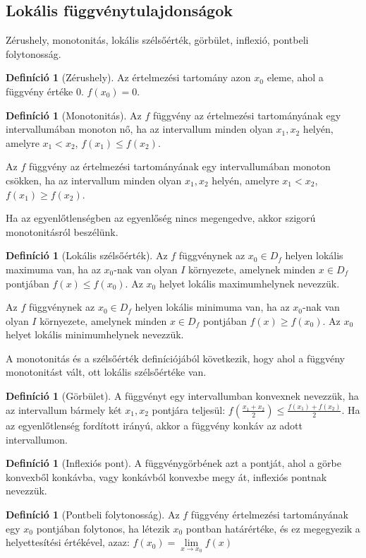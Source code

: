 \documentclass[twoside,12pt]{report}
\theoremstyle{definition}
\newtheorem{definition}[theorem]{Definíció}
\begin{document}
	\subsection{Lokális függvénytulajdonságok}
	Zérushely, monotonitás, lokális szélsőérték, görbület, inflexió, pontbeli folytonosság.
	\begin{definition}[Zérushely]
		Az értelmezési tartomány azon $x_0$ eleme, ahol a függvény értéke 0. $f(x_0)=0$.
	\end{definition}
	\begin{definition}[Monotonitás]
		Az $f$ függvény az értelmezési tartományának egy intervallumában monoton nő, ha az intervallum minden olyan $x_1, x_2$ helyén, amelyre $x_1<x_2$, $f(x_1)\le f(x_2)$.
		
		Az $f$ függvény az értelmezési tartományának egy intervallumában monoton csökken, ha az intervallum minden olyan $x_1, x_2$ helyén, amelyre $x_1<x_2$, $f(x_1)\ge f(x_2)$.
		
		Ha az egyenlőtlenségben az egyenlőség nincs megengedve, akkor szigorú monotonitásról
		beszélünk.
	\end{definition}
	\begin{definition}[Lokális szélsőérték]
		Az $f$ függvénynek az $x_0\in D_f$ helyen lokális maximuma van, ha az $x_0$-nak van olyan $I$ környezete, amelynek minden $x\in D_f$ pontjában $f(x)\le f(x_0)$. Az $x_0$ helyet lokális maximumhelynek nevezzük.
		
		Az $f$ függvénynek az $x_0\in D_f$ helyen lokális minimuma van, ha az $x_0$-nak van olyan $I$ környezete, amelynek minden $x\in D_f$ pontjában $f(x)\ge f(x_0)$. Az $x_0$ helyet lokális minimumhelynek nevezzük.
	\end{definition}
	A monotonitás és a szélsőérték definíciójából következik, hogy ahol a függvény monotonitást
	vált, ott lokális szélsőértéke van.
	\begin{definition}[Görbület]
		A függvényt egy intervallumban konvexnek nevezzük, ha az intervallum bármely két $x_1,x_2$ pontjára teljesül: $f\left(\frac{x_1+x_2}{2}\right)\le\frac{f(x_1)+f(x_2)}{2}$. Ha az egyenlőtlenség fordított irányú, akkor a függvény konkáv az adott intervallumon.
	\end{definition}
	\begin{definition}[Inflexiós pont]
		A függvénygörbének azt a pontját, ahol a görbe konvexből konkávba, vagy
		konkávból konvexbe megy át, inflexiós pontnak nevezzük.
	\end{definition}
	\begin{definition}[Pontbeli folytonosság]
		Az $f$ függvény értelmezési tartományának egy $x_0$ pontjában folytonos, ha létezik $x_0$ pontban határértéke, és ez megegyezik a helyettesítési értékével, azaz: $f(x_0)=\lim\limits_{x\to x_0}f(x)$
	\end{definition}
\end{document}

